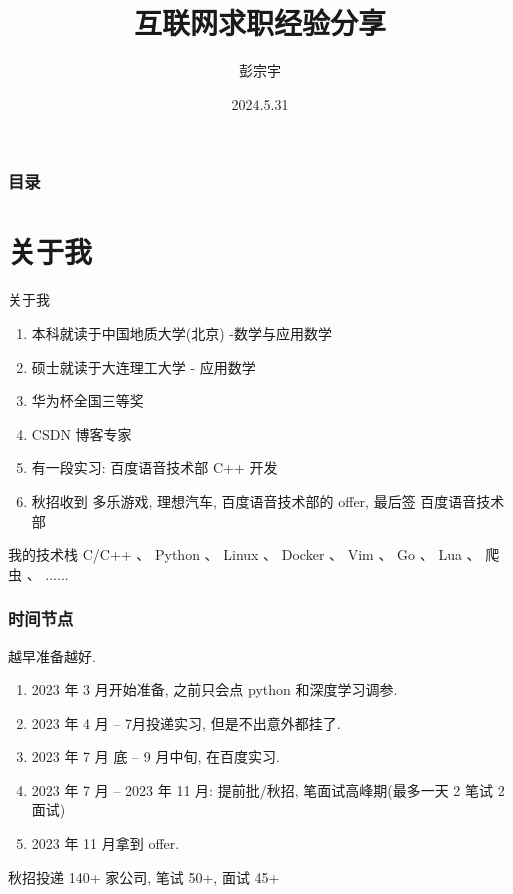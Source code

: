 \documentclass{ctexbeamer}
\title[互联网求职经验分享]{互联网求职经验分享}
\author[彭宗宇]{彭宗宇}
\institute[DLUT]{%
	大连理工大学
}
\date{2024.5.31}
\begin{document}
\maketitle

\begin{frame}
	\frametitle{\textbf{目录}}
	\tableofcontents
\end{frame}


\section{关于我}
\begin{frame}{关于我}
	\begin{enumerate}%
		\item 本科就读于中国地质大学(北京) -数学与应用数学
		\item 硕士就读于大连理工大学 - 应用数学
		\item 华为杯全国三等奖
		\item CSDN 博客专家
		\item 有一段实习: 百度语音技术部 C++ 开发
		\item 秋招收到 多乐游戏, 理想汽车, 百度语音技术部的 offer,  最后签 百度语音技术部
	\end{enumerate}

	\begin{block}{我的技术栈}%
		C/C++ 、 Python 、 Linux 、 Docker 、 Vim 、 Go 、 Lua 、 爬虫 、 ......
	\end{block}
\end{frame}

\begin{frame}
	\frametitle{时间节点}
	越早准备越好.
	\begin{enumerate}
		\item 2023 年 3 月开始准备, 之前只会点 python 和深度学习调参.
		\item 2023 年 4 月 -- 7月投递实习, 但是不出意外都挂了.
		\item 2023 年 7 月 底 -- 9 月中旬, 在百度实习.
		\item 2023 年 7 月 -- 2023 年 11 月: 提前批/秋招, 笔面试高峰期(最多一天 2 笔试 2 面试)
		\item 2023 年 11 月拿到 offer.
	\end{enumerate}
	秋招投递 140+ 家公司, 笔试 50+, 面试 45+
\end{frame}
\end{document}
